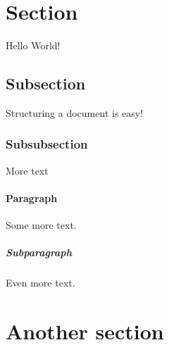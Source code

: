 \documentclass{article}
\begin{document}
	\section{Section}
	Hello World!
	\subsection{Subsection}
	Structuring a document is easy!
	\subsubsection{Subsubsection}
	More text
	\paragraph{Paragraph}
	Some more text.
	\subparagraph{Subparagraph}
	Even more text.
	\section{Another section}
\end{document}

